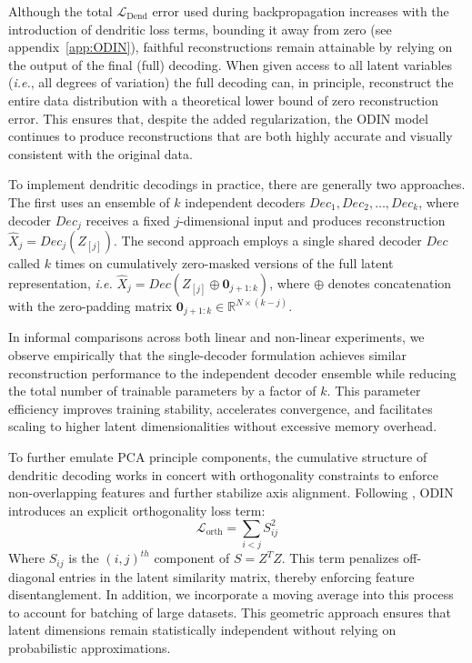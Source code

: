 \documentclass[twoside,11pt]{article}
\begin{document}
Although the total $\mathcal{L}_{\mathrm{Dend}}$ error used during backpropagation increases with the introduction of dendritic loss terms, bounding it away from zero (see appendix~\ref{app:ODIN}), faithful reconstructions remain attainable by relying on the output of the final (full) decoding. When given access to all latent variables (\emph{i.e.}, all degrees of variation) the full decoding can, in principle, reconstruct the entire data distribution with a theoretical lower bound of zero reconstruction error. This ensures that, despite the added regularization, the ODIN model continues to produce reconstructions that are both highly accurate and visually consistent with the original data.

To implement dendritic decodings in practice, there are generally two approaches. The first uses an ensemble of $k$ independent decoders ${Dec_1, Dec_2, \dots, Dec_k}$, where decoder $Dec_j$ receives a fixed $j$-dimensional input and produces reconstruction $\hat X_j = Dec_j(Z_{[j]})$. The second approach employs a single shared decoder $Dec$ called $k$ times on cumulatively zero-masked versions of the full latent representation, \emph{i.e.} $\hat X_j = Dec(Z_{[j]}\oplus \mathbf{0}_{j+1:k})$, where $\oplus$ denotes concatenation with the zero-padding matrix $\mathbf{0}_{j+1:k}\in \mathbb{R}^{N\times (k-j)}$.

In informal comparisons across both linear and non-linear experiments, we observe empirically that the single-decoder formulation achieves similar reconstruction performance to the independent decoder ensemble while reducing the total number of trainable parameters by a factor of $k$. This parameter efficiency improves training stability, accelerates convergence, and facilitates scaling to higher latent dimensionalities without excessive memory overhead.

To further emulate PCA principle components, the cumulative structure of dendritic decoding works in concert with orthogonality constraints to enforce non-overlapping features and further stabilize axis alignment. Following \cite{perozo2024principal}, ODIN introduces an explicit orthogonality loss term:
\begin{equation}
    \mathcal{L}_{\text{orth}} = \sum_{i<j}S_{ij}^2
\end{equation}
Where $S_{ij}$ is the $(i,j)^{th}$ component of $S = Z^TZ$. This term penalizes off-diagonal entries in the latent similarity matrix, thereby enforcing feature disentanglement. In addition, we incorporate a moving average into this process to account for batching of large datasets. This geometric approach ensures that latent dimensions remain statistically independent without relying on probabilistic approximations. 
\end{document}
